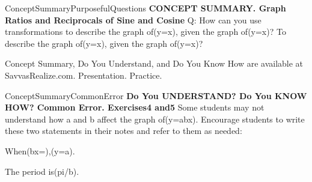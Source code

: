 \documentclass{article}
\newenvironment{te-addendum}[2]{}{}     %
\newcommand{\answer}[1]{}               %
\newcommand{\te}[1]{}                   %
\begin{document}
\begin{te-addendum}{ConceptSummary}{PurposefulQuestions}
\textbf{CONCEPT SUMMARY. Graph Ratios and Reciprocals of Sine and Cosine}
Q: How can you use transformations to describe the graph of(y=\cot x), given the graph of(y=\tan x)? To describe the graph of(y=\csc x), given the graph of(y=\sec x)?
\answer{The graph of(y=\cot x) is a reflection of(y=\tan x) across the y-axis, followed by a translation of(pi/2) units right. The graph of(y=\csc x) is a translation of(y=\sec x) shifted(pi/2) units right.}
Concept Summary, Do You Understand, and Do You Know How are available at SavvasRealize.com. Presentation. Practice.
\end{te-addendum}
\begin{te-addendum}{ConceptSummary}{CommonError}
\textbf{Do You UNDERSTAND? Do You KNOW HOW? Common Error. Exercises4 and5}
Some students may not understand how a and b affect the graph of(y=a\tan bx). Encourage students to write these two statements in their notes and refer to them as needed:
\item When(bx=\frac{}),(y=a).
\item The period is(pi/b).
\te{Printed bx=pi/2,y=a; likely bx=pi/4. Period formula assumes positive b.}
\end{te-addendum}
\end{document}
